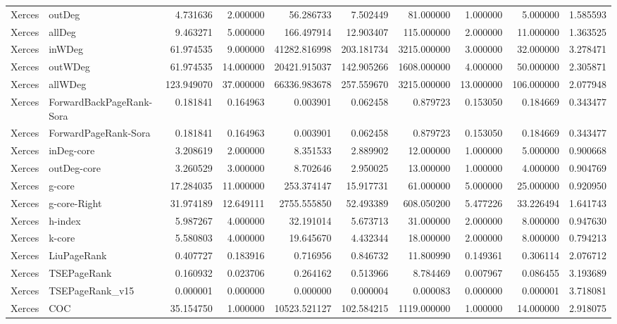 \begin{tabular}{llrrrrrrrr}
Xerces & outDeg & 4.731636 & 2.000000 & 56.286733 & 7.502449 & 81.000000 & 1.000000 & 5.000000 & 1.585593 \\
Xerces & allDeg & 9.463271 & 5.000000 & 166.497914 & 12.903407 & 115.000000 & 2.000000 & 11.000000 & 1.363525 \\
Xerces & inWDeg & 61.974535 & 9.000000 & 41282.816998 & 203.181734 & 3215.000000 & 3.000000 & 32.000000 & 3.278471 \\
Xerces & outWDeg & 61.974535 & 14.000000 & 20421.915037 & 142.905266 & 1608.000000 & 4.000000 & 50.000000 & 2.305871 \\
Xerces & allWDeg & 123.949070 & 37.000000 & 66336.983678 & 257.559670 & 3215.000000 & 13.000000 & 106.000000 & 2.077948 \\
Xerces & ForwardBackPageRank-Sora & 0.181841 & 0.164963 & 0.003901 & 0.062458 & 0.879723 & 0.153050 & 0.184669 & 0.343477 \\
Xerces & ForwardPageRank-Sora & 0.181841 & 0.164963 & 0.003901 & 0.062458 & 0.879723 & 0.153050 & 0.184669 & 0.343477 \\
Xerces & inDeg-core & 3.208619 & 2.000000 & 8.351533 & 2.889902 & 12.000000 & 1.000000 & 5.000000 & 0.900668 \\
Xerces & outDeg-core & 3.260529 & 3.000000 & 8.702646 & 2.950025 & 13.000000 & 1.000000 & 4.000000 & 0.904769 \\
Xerces & g-core & 17.284035 & 11.000000 & 253.374147 & 15.917731 & 61.000000 & 5.000000 & 25.000000 & 0.920950 \\
Xerces & g-core-Right & 31.974189 & 12.649111 & 2755.555850 & 52.493389 & 608.050200 & 5.477226 & 33.226494 & 1.641743 \\
Xerces & h-index & 5.987267 & 4.000000 & 32.191014 & 5.673713 & 31.000000 & 2.000000 & 8.000000 & 0.947630 \\
Xerces & k-core & 5.580803 & 4.000000 & 19.645670 & 4.432344 & 18.000000 & 2.000000 & 8.000000 & 0.794213 \\
Xerces & LiuPageRank & 0.407727 & 0.183916 & 0.716956 & 0.846732 & 11.800990 & 0.149361 & 0.306114 & 2.076712 \\
Xerces & TSEPageRank & 0.160932 & 0.023706 & 0.264162 & 0.513966 & 8.784469 & 0.007967 & 0.086455 & 3.193689 \\
Xerces & TSEPageRank_v15 & 0.000001 & 0.000000 & 0.000000 & 0.000004 & 0.000083 & 0.000000 & 0.000001 & 3.718081 \\
Xerces & COC & 35.154750 & 1.000000 & 10523.521127 & 102.584215 & 1119.000000 & 1.000000 & 14.000000 & 2.918075 \\

\end{tabular}
